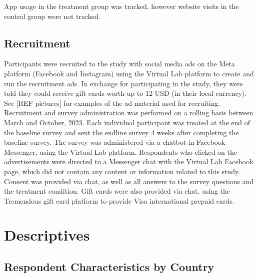 \documentclass{article}
\begin{document}
App usage in the treatment group was tracked, however website visits in the control group were not tracked.


\subsection*{Recruitment}

Participants were recruited to the study with social media ads on the Meta platform (Facebook and Instagram) using the Virtual Lab platform to create and run the recruitment ads. In exchange for participating in the study, they were told they could receive gift cards worth up to 12 USD (in their local currency). See [REF pictures] for examples of the ad material used for recruiting.
Recruitment and survey administration was performed on a rolling basis between March and October, 2023. Each individual participant was treated at the end of the baseline survey and sent the endline survey 4 weeks after completing the baseline survey.
The survey was administered via a chatbot in Facebook Messenger, using the Virtual Lab platform. Respondents who clicked on the advertisements were directed to a Messenger chat with the Virtual Lab Facebook page, which did not contain any content or information related to this study. Consent was provided via chat, as well as all answers to the survey questions and the treatment condition. Gift cards were also provided via chat, using the Tremendous gift card platform to provide Visa international prepaid cards.



\section*{Descriptives}


\subsection*{Respondent Characteristics by Country}



\end{document}
